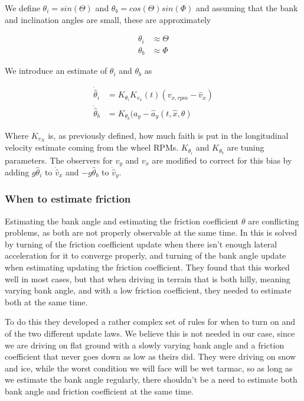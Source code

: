 We define $\theta_i = sin(\Theta)$ and $\theta_b = cos(\Theta)sin(\Phi)$ and assuming that the bank and inclination angles are small, these are approximately 

\begin{align}
    \theta_i & \approx \Theta \\
    \theta_b & \approx \Phi
\end{align}

We introduce an estimate of $\theta_i$ and $\theta_b$ as

\begin{align}
    \dot{\hat{\theta}}_i & = K_{\theta_i}K_{v_x}(t)(v_{x,rpm} - \hat{v}_x) \\
    \dot{\hat{\theta}}_b & = K_{\theta_b}(a_y-\hat{a}_y(t,\hat{x},\theta)
\end{align}

Where $K_{v_X}$ is, as previously defined, how much faith is put in the longitudinal velocity estimate coming from the wheel RPMs. $K_{\theta_i}$ and $K_{\theta_b}$ are tuning parameters. The observers for $v_y$ and $v_x$ are modified to correct for this bias by adding $g\hat{\theta}_i$ to $\dot{\hat{v}}_x$ and $-g\hat{\theta}_b$ to $\dot{\hat{v}}_y$. 

\subsubsection{When to estimate friction}

Estimating the bank angle and estimating the friction coefficient $\theta$ are conflicting problems, as both are not properly observable at the same time. In \cite{MainStateEst} this is solved by turning of the friction coefficient update when there isn't enough lateral acceleration for it to converge properly, and turning of the bank angle update when estimating updating the friction coefficient. They found that this worked well in most cases, but that when driving in terrain that is both hilly, meaning varying bank angle, and with a low friction coefficient, they needed to estimate both at the same time. 

To do this they developed a rather complex set of rules for when to turn on and of the two different update laws. We believe this is not needed in our case, since we are driving on flat ground with a slowly varying bank angle and a friction coefficient that never goes down as low as theirs did. They were driving on snow and ice, while the worst condition we will face will be wet tarmac, so as long as we estimate the bank angle regularly, there shouldn't be a need to estimate both bank angle and friction coefficient at the same time. 

